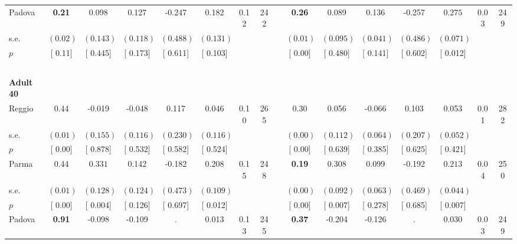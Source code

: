 \begin{longtable}{L{8em} c c c c c c c p{1em} c c c c c c c}
\quad \quad \quad Padova& \textbf{     0.21} &     0.098 &     0.127 &    -0.247 &     0.182 &      0.12 &       242 & & \textbf{     0.26} &     0.089 &     0.136 &    -0.257 & $ \mathbf{    0.275}$ &      0.03 &       249  \\*
\quad \quad \quad \quad s.e.& $ (     0.02)$ & $ (    0.143)$ & $ (    0.118)$ & $ (    0.488)$ & $ (    0.131)$ & & & & $ (     0.01)$ & $ (    0.095)$ & $ (    0.041)$ & $ (    0.486)$ & $ (    0.071)$ & &  \\*
\quad \quad \quad \quad $ p$ & [     0.11] & [    0.445] & [    0.173] & [    0.611] & [    0.103] & & & & [     0.00] & [    0.480] & [    0.141] & [    0.602] & [    0.012] & &  \\[1em]
~\\[1em]
\quad \quad \textbf{Adult 40} & & & & & & & & & & & & & & & \\* 
\quad \quad \quad Reggio& 0.44 &    -0.019 &    -0.048 &     0.117 &     0.046 &      0.10 &       265 & & 0.30 &     0.056 &    -0.066 &     0.103 &     0.053 &      0.01 &       282  \\*
\quad \quad \quad \quad s.e.& $ (     0.01)$ & $ (    0.155)$ & $ (    0.116)$ & $ (    0.230)$ & $ (    0.116)$ & & & & $ (     0.00)$ & $ (    0.112)$ & $ (    0.064)$ & $ (    0.207)$ & $ (    0.052)$ & &  \\*
\quad \quad \quad \quad $ p$ & [     0.00] & [    0.878] & [    0.532] & [    0.582] & [    0.524] & & & & [     0.00] & [    0.639] & [    0.385] & [    0.625] & [    0.421] & &  \\[1em]
\quad \quad \quad Parma& 0.44 & $ \mathbf{    0.331}$ &     0.142 &    -0.182 & $ \mathbf{    0.208}$ &      0.15 &       248 & & \textbf{     0.19} & $ \mathbf{    0.308}$ &     0.099 &    -0.192 & $ \mathbf{    0.213}$ &      0.04 &       250  \\*
\quad \quad \quad \quad s.e.& $ (     0.01)$ & $ (    0.128)$ & $ (    0.124)$ & $ (    0.473)$ & $ (    0.109)$ & & & & $ (     0.00)$ & $ (    0.092)$ & $ (    0.063)$ & $ (    0.469)$ & $ (    0.044)$ & &  \\*
\quad \quad \quad \quad $ p$ & [     0.00] & [    0.004] & [    0.126] & [    0.697] & [    0.012] & & & & [     0.00] & [    0.007] & [    0.278] & [    0.685] & [    0.007] & &  \\[1em]
\quad \quad \quad Padova& \textbf{     0.91} &    -0.098 &    -0.109 &         . &     0.013 &      0.13 &       245 & & \textbf{     0.37} &    -0.204 &    -0.126 &         . &     0.030 &      0.03 &       249  \\*

\end{longtable}
